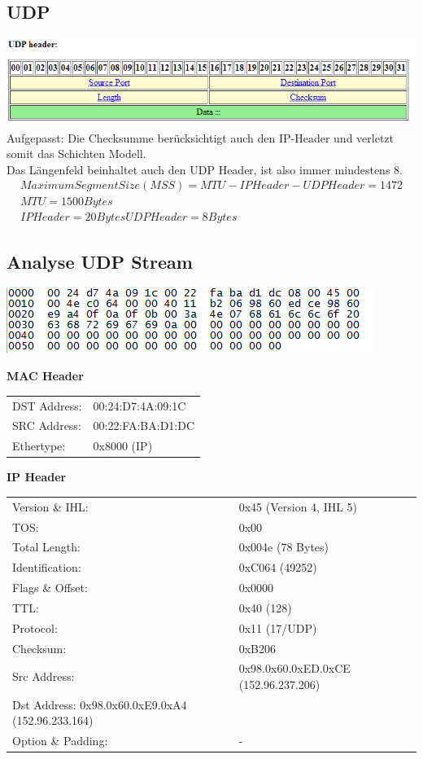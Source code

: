 \subsection{UDP}
\includegraphics[scale=0.8]{media/UDPHeader.png}
Aufgepasst: Die Checksumme berücksichtigt auch den IP-Header und verletzt somit das Schichten Modell. \\
Das Längenfeld beinhaltet auch den UDP Header, ist also immer mindestens 8.
\\
\begin{align*}
Maximum Segment Size (MSS) = MTU - IPHeader - UDP Header = 1472\\
MTU = 1500Bytes\\
IPHeader = 20 Bytes
UDPHeader = 8Bytes
\end{align*}

\subsection{Analyse UDP Stream}
\includegraphics[scale=1.0]{media/UDPStream.png}

\textbf{MAC Header}\\
\begin{tabular}[h]{ll}
DST Address: & 00:24:D7:4A:09:1C\\
SRC Address: & 00:22:FA:BA:D1:DC\\
Ethertype: & 0x8000 (IP)\\
\end{tabular}


\textbf{IP Header}\\
\begin{tabular}[h]{ll}
Version \& IHL: & 0x45 (Version 4, IHL 5)\\
TOS: & 0x00\\
Total Length: & 0x004e (78 Bytes)\\
Identification: & 0xC064 (49252)\\
Flags \& Offset: & 0x0000\\
TTL: & 0x40 (128)\\
Protocol: & 0x11 (17/UDP)\\
Checksum: & 0xB206 \\
Src Address: & 0x98.0x60.0xED.0xCE (152.96.237.206)\\
Dst Address: 0x98.0x60.0xE9.0xA4 (152.96.233.164)\\
Option \& Padding: & -\\
\end{tabular}

